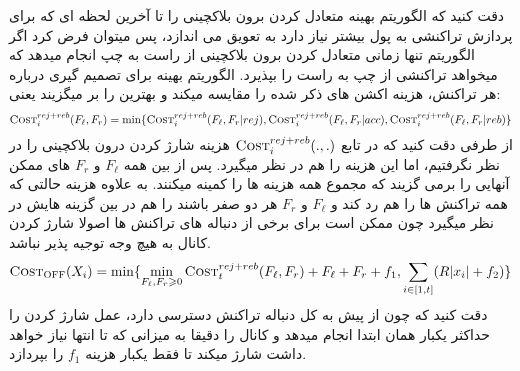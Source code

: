دقت کنید که الگوریتم بهینه متعادل کردن برون بلاکچینی را تا آخرین لحظه ای که برای پردازش تراکنشی به پول بیشتر نیاز دارد به تعویق می اندازد، پس میتوان فرض کرد اگر الگوریتم تنها زمانی متعادل کردن برون بلاکچینی از راست به چپ انجام میدهد که میخواهد تراکنشی از چپ به راست را بپذیرد.
الگوریتم بهینه برای تصمیم گیری درباره هر تراکنش، هزینه اکشن های ذکر شده را مقایسه میکند و بهترین را بر میگزیند یعنی:
\begin{equation}\label{eq:dynamic_prog_costrejreb}
\textsc{Cost}_{i}^{rej+reb}(F_{\ell},F_{r}) = \min\{\textsc{Cost}_{i}^{rej+reb}(F_{\ell},F_{r}|rej), \textsc{Cost}_{i}^{rej+reb}(F_{\ell},F_{r}|acc), \textsc{Cost}_{i}^{rej+reb}(F_{\ell},F_{r}|reb) \}
\end{equation}
 از طرفی دقت کنید که در تابع
$\textsc{Cost}_{i}^{rej+reb}(.,.)$
هزینه شارژ کردن درون بلاکچینی را در نظر نگرفتیم، اما \off این هزینه را هم در نظر میگیرد. پس \off از بین همه 
$F_{\ell}$
و
$F_r$
های ممکن آنهایی را برمی گزیند که مجموع همه هزینه ها را کمینه میکنند. به علاوه \off هزینه حالتی که همه تراکنش ها را هم رد کند و 
$F_{\ell}$
و
$F_r$
هر دو صفر باشند را هم در بین گزینه هایش در نظر میگیرد چون ممکن است برای برخی از دنباله های تراکنش ها اصولا شارژ کردن کانال به هیچ وجه توجیه پذیر نباشد.
\begin{equation}\label{eq:dynamic_prog_costoff}
\textsc{Cost}_{\textsc{OFF}}(X_i)  = \min\{\min_{F_{\ell},F_r \geqslant 0}  \textsc{Cost}_{t}^{rej+reb}(F_{\ell},F_{r}) + F_{\ell} + F_{r} + f_1, \sum_{i \in [1,t]} (R|x_i|+f_2)\}
\end{equation}
دقت کنید که \off چون از پیش به کل دنباله تراکنش دسترسی دارد، عمل شارژ کردن را حداکثر یکبار همان ابتدا انجام میدهد و کانال را دقیقا به میزانی که تا انتها نیاز خواهد داشت شارژ میکند تا فقط یکبار هزینه
$f_1$
را بپردازد.

